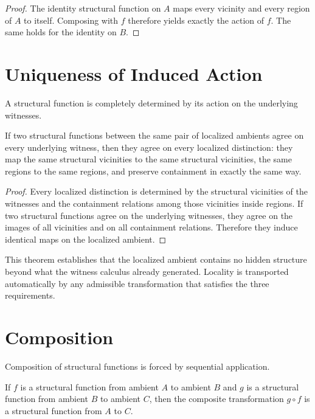 \documentclass[12pt,anyside]{book}
\begin{document}
\begin{proof}
The identity structural function on $A$ maps every vicinity and every region of $A$ to itself. Composing with $f$ therefore yields exactly the action of $f$. The same holds for the identity on $B$.
\end{proof}

\section{Uniqueness of Induced Action}
A structural function is completely determined by its action on the underlying witnesses.

\begin{theorem}
If two structural functions between the same pair of localized ambients agree on every underlying witness, then they agree on every localized distinction: they map the same structural vicinities to the same structural vicinities, the same regions to the same regions, and preserve containment in exactly the same way.
\end{theorem}

\begin{proof}
Every localized distinction is determined by the structural vicinities of the witnesses and the containment relations among those vicinities inside regions. If two structural functions agree on the underlying witnesses, they agree on the images of all vicinities and on all containment relations. Therefore they induce identical maps on the localized ambient.
\end{proof}

This theorem establishes that the localized ambient contains no hidden structure beyond what the witness calculus already generated. Locality is transported automatically by any admissible transformation that satisfies the three requirements.

\section{Composition}
Composition of structural functions is forced by sequential application.

\begin{theorem}
If $f$ is a structural function from ambient $A$ to ambient $B$ and $g$ is a structural function from ambient $B$ to ambient $C$, then the composite transformation $g \circ f$ is a structural function from $A$ to $C$.
\end{theorem}
\end{document}
